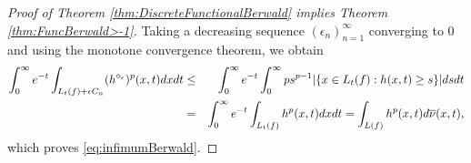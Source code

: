 \documentclass{amsart}
\newcommand{\R}{\mathbb R}
\newcommand{\N}{\mathbb N}
\theoremstyle{remark}
\theoremstyle{definition}
\numberwithin{equation}{section}
\begin{document}
\begin{proof}[Proof of Theorem \ref{thm:DiscreteFunctionalBerwald} implies Theorem \ref{thm:FuncBerwald>-1}]
Taking a decreasing sequence $(\epsilon_n)_{n=1}^\infty$ converging to $0$ and using the monotone convergence theorem, we obtain
\begin{eqnarray*}
\int_0^{\infty} e^{-t} \int_{L_t(f)+\epsilon C_n} (h^{\diamond_{\epsilon}})^p (x,t) dxdt&\leq&\int_0^{\infty} e^{-t} \int_0^{\infty} ps^{p-1} |\{ x \in L_t(f)  : h(x,t) \geq s \}| ds dt\cr
&=&\int_0^\infty e^{-t}\int_{L_t(f)}h^p(x,t)dxdt=\int_{L(f)}h^p(x,t)d\overline{\nu}(x,t),
\end{eqnarray*}
which proves \eqref{eq:infimumBerwald}.





\end{proof}
\end{document}
